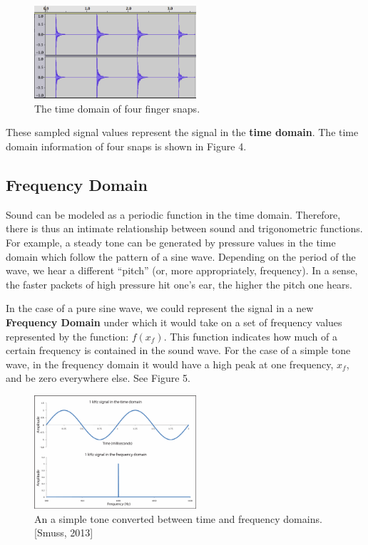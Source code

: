 \documentclass[DIV=calc, paper=a4, fontsize=11pt, twocolumn]{scrartcl}   %
\begin{document}
\begin{figure}[h]
\centering
\includegraphics[width=60mm]{figures/snap_timedomain.png}
\caption{The time domain of four finger snaps.}
\label{overflow}
\end{figure}

These sampled signal values represent the signal in the \textbf{time domain}. The time domain information of four snaps is shown in Figure 4.
\subsection{Frequency Domain}
Sound can be modeled as a periodic function in the time domain. Therefore, there is thus an intimate relationship between sound and trigonometric functions. For example, a steady tone can be generated by pressure values in the time domain which follow the pattern of a sine wave. Depending on the period of the wave, we hear a different ``pitch'' (or, more appropriately, frequency). In a sense, the faster packets of high pressure hit one's ear, the higher the pitch one hears.
\par  In the case of a pure sine wave, we could represent the signal in a new \textbf{Frequency Domain} under which it would take on a set of frequency values represented by the function: $f(x_f)$. This function indicates how much of a certain frequency is contained in the sound wave. For the case of a simple tone wave, in the frequency domain it would have a high peak at one frequency, $x_f$, and be zero everywhere else. See Figure 5.

\begin{figure}[h]
\centering
\includegraphics[width=60mm]{figures/twodomains.png}
\caption{An a simple tone converted between time and frequency domains.[Smuss, 2013]}
\label{overflow}
\end{figure}
\end{document}
